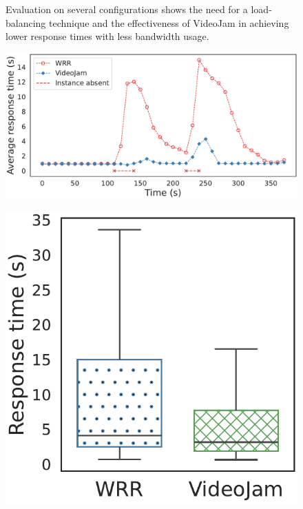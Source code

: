 \begin{figure}[htb]
\begin{minipage}[t]{.3\linewidth}
		\label{fig:against_wrr_bandwidth}
	\end{minipage}
	\vspace{-1mm}
	\caption{Evaluation on several configurations shows the need for a load-balancing technique and the effectiveness of VideoJam in achieving lower response times with less bandwidth usage.}
	\vspace{-3mm}
	\label{fig:against_wrr}
\end{figure}

\begin{figure}[htb]
	\centering
	\begin{minipage}[t]{.66\linewidth}
		\centering
		\includegraphics[width=\linewidth]{chapters/videojam/images/adaptability/average_response_time_timeseries.pdf}
		\label{fig:adaptability_avg_response_time}
	\end{minipage}
	\begin{minipage}[t]{.32\linewidth}
		\centering
		\includegraphics[width=\linewidth]{chapters/videojam/images/adaptability/response_time.pdf}

\end{minipage}
\end{figure}
